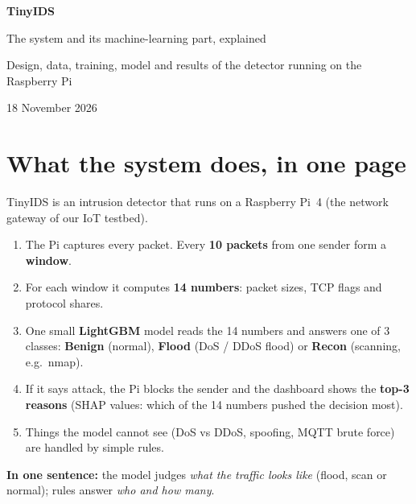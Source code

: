 \documentclass[11pt,a4paper]{article}
\newcommand{\keybox}[1]{\par\smallskip\noindent\colorbox{accent!8}{\parbox{\dimexpr\linewidth-2\fboxsep}{\vspace{0.5em}#1\vspace{0.5em}}}\par\medskip}
\begin{document}
\begin{titlepage}
\centering
\vspace*{5cm}
{\Huge\bfseries\color{accent} TinyIDS\par}
\vspace{1.2em}
{\LARGE The system and its machine-learning part, explained\par}
\vspace{2.5em}
{\large Design, data, training, model and results of the detector running on the Raspberry Pi\par}
\vfill
{\large 18 November 2026\par}
\vspace{2cm}
\end{titlepage}

\tableofcontents
\newpage

\section{What the system does, in one page}

TinyIDS is an intrusion detector that runs on a Raspberry Pi~4 (the network gateway of our IoT testbed).

\begin{enumerate}
  \item The Pi captures every packet. Every \textbf{10 packets} from one sender form a \textbf{window}.
  \item For each window it computes \textbf{14 numbers}: packet sizes, TCP flags and protocol shares.
  \item One small \textbf{LightGBM} model reads the 14 numbers and answers one of 3 classes:
        \textbf{Benign} (normal), \textbf{Flood} (DoS / DDoS flood) or \textbf{Recon} (scanning, e.g.\ nmap).
  \item If it says attack, the Pi blocks the sender and the dashboard shows the \textbf{top-3 reasons}
        (SHAP values: which of the 14 numbers pushed the decision most).
  \item Things the model cannot see (DoS vs DDoS, spoofing, MQTT brute force) are handled by simple rules.
\end{enumerate}

\keybox{\textbf{In one sentence:} the model judges \emph{what the traffic looks like} (flood, scan or normal);
rules answer \emph{who and how many}.}

\newpage
\end{document}
